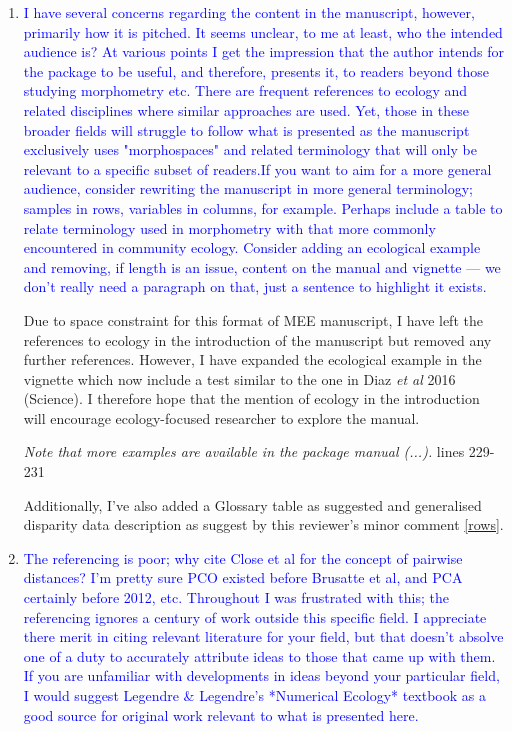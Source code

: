 \documentclass[12pt,letterpaper]{article}
\begin{document}
\begin{enumerate}

\item{\textcolor{blue}{I have several concerns regarding the content in the manuscript, however, primarily how it is pitched.
It seems unclear, to me at least, who the intended audience is?
At various points I get the impression that the author intends for the package to be useful, and therefore, presents it, to readers beyond those studying morphometry etc.
There are frequent references to ecology and related disciplines where similar approaches are used.
Yet, those in these broader fields will struggle to follow what is presented as the manuscript exclusively uses "morphospaces" and related terminology that will only be relevant to a specific subset of readers.If you want to aim for a more general audience, consider rewriting the manuscript in more general terminology; samples in rows, variables in columns, for example.
Perhaps include a table to relate terminology used in morphometry with that more commonly encountered in community ecology.
Consider adding an ecological example and removing, if length is an issue, content on the manual and vignette --- we don't really need a paragraph on that, just a sentence to highlight it exists.}}

Due to space constraint for this format of MEE manuscript, I have left the references to ecology in the introduction of the manuscript but removed any further references.
However, I have expanded the ecological example in the vignette which now include a test similar to the one in Diaz \textit{et al} 2016 (Science).
I therefore hope that the mention of ecology in the introduction will encourage ecology-focused researcher to explore the manual.

\textit{Note that more examples are available in the package manual (...).} lines 229-231

Additionally, I've also added a Glossary table as suggested and generalised disparity data description as suggest by this reviewer's minor comment \ref{rows}.

\item{\textcolor{blue}{The referencing is poor; why cite Close et al for the concept of pairwise distances?
I'm pretty sure PCO existed before Brusatte et al, and PCA certainly before 2012, etc.
Throughout I was frustrated with this; the referencing ignores a century of work outside this specific field.
I appreciate there merit in citing relevant literature for your field, but that doesn't absolve one of a duty to accurately attribute ideas to those that came up with them.
If you are unfamiliar with developments in ideas beyond your particular field, I would suggest Legendre \& Legendre's *Numerical Ecology* textbook as a good source for original work relevant to what is presented here.}}


\end{enumerate}
\end{document}
